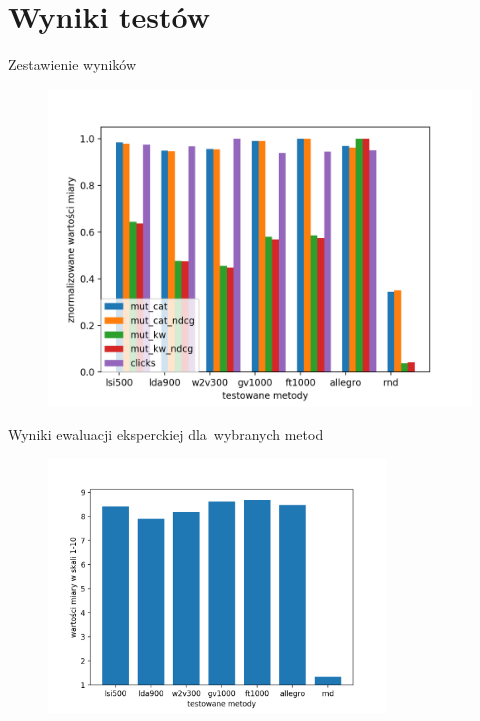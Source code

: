 \documentclass{beamer}
\begin{document}
	\section{Wyniki testów}
	\begin{frame}{Zestawienie wyników}
		\begin{figure}[H]
			\centering
			\includegraphics[width=1\textwidth]{img/results/lsi500_lda900_w2v300_gv1000_ft1000_allegro_rnd_.png}
		\end{figure}
	\end{frame}
	\begin{frame}{Wyniki ewaluacji eksperckiej dla~wybranych metod}
		\begin{figure}[H]
			\centering
			\includegraphics[width=0.8\textwidth]{img/results/lsi500_lda900_w2v300_gv1000_ft1000_allegro_rnd_users.png}
		\end{figure}
	\end{frame}
\end{document}
